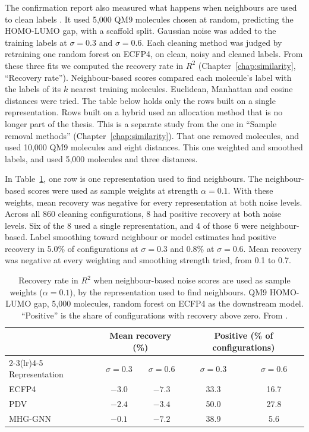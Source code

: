 The confirmation report also measured what happens when neighbours are used to clean labels \citep{Punt2026confirmation}. It used 5,000 QM9 molecules chosen at random, predicting the HOMO-LUMO gap, with a scaffold split. Gaussian noise was added to the training labels at $\sigma = 0.3$ and $\sigma = 0.6$. Each cleaning method was judged by retraining one random forest on ECFP4, on clean, noisy and cleaned labels. From these three fits we computed the recovery rate in $R^2$ (Chapter~\ref{chap:similarity}, ``Recovery rate''). Neighbour-based scores compared each molecule's label with the labels of its $k$ nearest training molecules. Euclidean, Manhattan and cosine distances were tried. The table below holds only the rows built on a single representation. Rows built on a hybrid used an allocation method that is no longer part of the thesis. This is a separate study from the one in ``Sample removal methods'' (Chapter~\ref{chap:similarity}). That one removed molecules, and used 10,000 QM9 molecules and eight distances. This one weighted and smoothed labels, and used 5,000 molecules and three distances.

In Table~\ref{tab:code_input_neighbour_recovery}, one row is one representation used to find neighbours. The neighbour-based scores were used as sample weights at strength $\alpha = 0.1$. With these weights, mean recovery was negative for every representation at both noise levels. Across all 860 cleaning configurations, 8 had positive recovery at both noise levels. Six of the 8 used a single representation, and 4 of those 6 were neighbour-based. Label smoothing toward neighbour or model estimates had positive recovery in 5.0\% of configurations at $\sigma = 0.3$ and 0.8\% at $\sigma = 0.6$. Mean recovery was negative at every weighting and smoothing strength tried, from 0.1 to 0.7.

\begin{table}[htbp]
\centering
\caption{Recovery rate in $R^2$ when neighbour-based noise scores are used as sample weights ($\alpha = 0.1$), by the representation used to find neighbours. QM9 HOMO-LUMO gap, 5,000 molecules, random forest on ECFP4 as the downstream model. ``Positive'' is the share of configurations with recovery above zero. From \citet{Punt2026confirmation}.}
\label{tab:code_input_neighbour_recovery}
\begin{tabular}{lcccc}
\toprule
 & \multicolumn{2}{c}{Mean recovery (\%)} & \multicolumn{2}{c}{Positive (\% of configurations)} \\
\cmidrule(lr){2-3}\cmidrule(lr){4-5}
Representation & $\sigma = 0.3$ & $\sigma = 0.6$ & $\sigma = 0.3$ & $\sigma = 0.6$ \\
\midrule
ECFP4   & $-3.0$ & $-7.3$ & 33.3 & 16.7 \\
PDV     & $-2.4$ & $-3.4$ & 50.0 & 27.8 \\
MHG-GNN & $-0.1$ & $-7.2$ & 38.9 & 5.6 \\
\bottomrule
\end{tabular}
\end{table}

